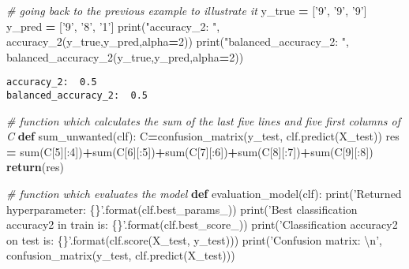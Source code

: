 \documentclass[10pt,a4paper]{article}
\newenvironment{Shaded}{\begin{snugshade}}{\end{snugshade}}
\newcommand{\BuiltInTok}[1]{#1}
\newcommand{\CharTok}[1]{\textcolor[rgb]{0.31,0.60,0.02}{#1}}
\newcommand{\CommentTok}[1]{\textcolor[rgb]{0.56,0.35,0.01}{\textit{#1}}}
\newcommand{\ControlFlowTok}[1]{\textcolor[rgb]{0.13,0.29,0.53}{\textbf{#1}}}
\newcommand{\DecValTok}[1]{\textcolor[rgb]{0.00,0.00,0.81}{#1}}
\newcommand{\KeywordTok}[1]{\textcolor[rgb]{0.13,0.29,0.53}{\textbf{#1}}}
\newcommand{\NormalTok}[1]{#1}
\newcommand{\OperatorTok}[1]{\textcolor[rgb]{0.81,0.36,0.00}{\textbf{#1}}}
\newcommand{\SpecialCharTok}[1]{\textcolor[rgb]{0.00,0.00,0.00}{#1}}
\newcommand{\StringTok}[1]{\textcolor[rgb]{0.31,0.60,0.02}{#1}}
\theoremstyle{break}
\begin{document}
\begin{Shaded}
\begin{Highlighting}[]
\CommentTok{# going back to the previous example to illustrate it}
\NormalTok{y_true }\OperatorTok{=}\NormalTok{ [}\StringTok{'9'}\NormalTok{, }\StringTok{'9'}\NormalTok{, }\StringTok{'9'}\NormalTok{] }
\NormalTok{y_pred }\OperatorTok{=}\NormalTok{ [}\StringTok{'9'}\NormalTok{, }\StringTok{'8'}\NormalTok{, }\StringTok{'1'}\NormalTok{] }
\BuiltInTok{print}\NormalTok{(}\StringTok{"accuracy_2: "}\NormalTok{, accuracy_2(y_true,y_pred,alpha}\OperatorTok{=}\DecValTok{2}\NormalTok{))}
\BuiltInTok{print}\NormalTok{(}\StringTok{"balanced_accuracy_2: "}\NormalTok{, balanced_accuracy_2(y_true,y_pred,alpha}\OperatorTok{=}\DecValTok{2}\NormalTok{)) }
\end{Highlighting}
\end{Shaded}

\begin{verbatim}
accuracy_2:  0.5
balanced_accuracy_2:  0.5
\end{verbatim}

\begin{Shaded}
\begin{Highlighting}[]
\CommentTok{# function which calculates the sum of the last five lines and five first columns of C}
\KeywordTok{def}\NormalTok{ sum_unwanted(clf):}
\NormalTok{    C}\OperatorTok{=}\NormalTok{confusion_matrix(y_test, clf.predict(X_test))}
\NormalTok{    res }\OperatorTok{=} \BuiltInTok{sum}\NormalTok{(C[}\DecValTok{5}\NormalTok{][:}\DecValTok{4}\NormalTok{])}\OperatorTok{+}\BuiltInTok{sum}\NormalTok{(C[}\DecValTok{6}\NormalTok{][:}\DecValTok{5}\NormalTok{])}\OperatorTok{+}\BuiltInTok{sum}\NormalTok{(C[}\DecValTok{7}\NormalTok{][:}\DecValTok{6}\NormalTok{])}\OperatorTok{+}\BuiltInTok{sum}\NormalTok{(C[}\DecValTok{8}\NormalTok{][:}\DecValTok{7}\NormalTok{])}\OperatorTok{+}\BuiltInTok{sum}\NormalTok{(C[}\DecValTok{9}\NormalTok{][:}\DecValTok{8}\NormalTok{])}
    \ControlFlowTok{return}\NormalTok{(res)}
\end{Highlighting}
\end{Shaded}

\begin{Shaded}
\begin{Highlighting}[]
\CommentTok{# function which evaluates the model}
\KeywordTok{def}\NormalTok{ evaluation_model(clf):}
    \BuiltInTok{print}\NormalTok{(}\StringTok{'Returned hyperparameter: }\SpecialCharTok{\{\}}\StringTok{'}\NormalTok{.}\BuiltInTok{format}\NormalTok{(clf.best_params_))}
    \BuiltInTok{print}\NormalTok{(}\StringTok{'Best classification accuracy2 in train is: }\SpecialCharTok{\{\}}\StringTok{'}\NormalTok{.}\BuiltInTok{format}\NormalTok{(clf.best_score_))}
    \BuiltInTok{print}\NormalTok{(}\StringTok{'Classification accuracy2 on test is: }\SpecialCharTok{\{\}}\StringTok{'}\NormalTok{.}\BuiltInTok{format}\NormalTok{(clf.score(X_test, y_test)))}
    \BuiltInTok{print}\NormalTok{(}\StringTok{'Confusion matrix: }\CharTok{\textbackslash{}n}\StringTok{'}\NormalTok{, confusion_matrix(y_test, clf.predict(X_test)))}
\end{Highlighting}
\end{Shaded}
\end{document}
